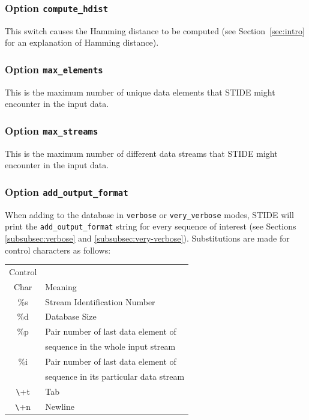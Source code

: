 \documentclass{amsart}
\begin{document}
\subsubsection{Option {\tt compute\_hdist}}
This switch causes the Hamming distance \cite{lightweight} to be
computed (see Section~\ref{sec:intro} for an explanation of Hamming
distance).
  
\subsubsection{Option {\tt max\_elements}}
This is the maximum number of unique data elements that STIDE might
encounter in the input data.

\subsubsection{Option {\tt max\_streams}}
This is the maximum number of different data streams that STIDE might
encounter in the input data.

\subsubsection{Option {\tt add\_output\_format}} \label{subsubsec:aof}

When adding to the database in {\tt verbose} or {\tt very\_verbose}
modes, STIDE will print the {\tt add\_output\_format} string for every
sequence of interest (see Sections \ref{subsubsec:verbose} and
\ref{subsubsec:very-verbose}).  Substitutions are made for control
characters as follows:

\vspace{.15in}

\begin{tabular}{c|l}
\vspace{-4pt}
Control \\ Char &  Meaning \\ \hline
       \%s  & Stream Identification Number \\
       \%d  & Database Size  \\
\vspace{-4pt}
       \%p  & Pair number of last data element of \\
            & sequence in the whole input stream  \\
\vspace{-4pt}
       \%i  & Pair number of last data element of    \\
            & sequence in its particular data stream \\
       \verb+\+t & Tab    \\
       \verb+\+n & Newline    \\
\end{tabular}
\end{document}
